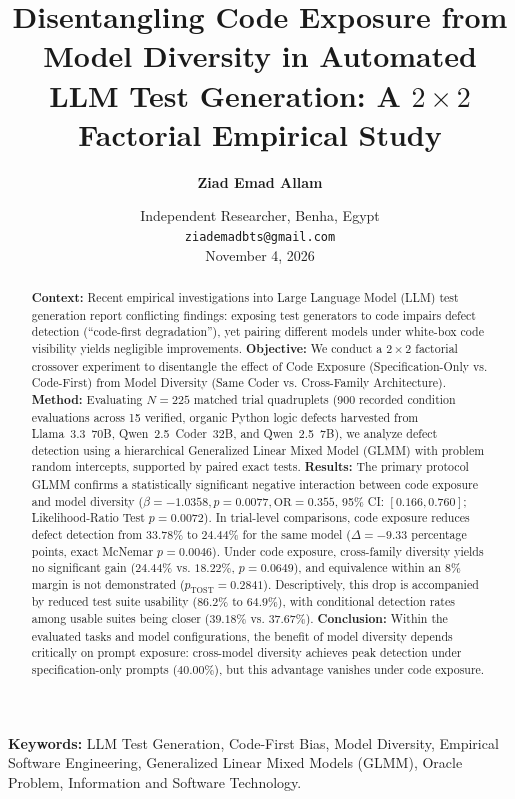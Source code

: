 \documentclass[11pt,a4paper]{article}
\title{\textbf{Disentangling Code Exposure from Model Diversity in Automated LLM Test Generation: A $2 \times 2$ Factorial Empirical Study}}
\author{\textbf{Ziad Emad Allam}}
\date{Independent Researcher, Benha, Egypt \\ \texttt{ziademadbts@gmail.com}\\[1em] November 4, 2026}
\begin{document}
\maketitle

\begin{abstract}
\noindent\textbf{Context:} Recent empirical investigations into Large Language Model (LLM) test generation report conflicting findings: exposing test generators to code impairs defect detection (``code-first degradation''), yet pairing different models under white-box code visibility yields negligible improvements.
\textbf{Objective:} We conduct a $2 \times 2$ factorial crossover experiment to disentangle the effect of Code Exposure (Specification-Only vs. Code-First) from Model Diversity (Same Coder vs. Cross-Family Architecture).
\textbf{Method:} Evaluating $N=225$ matched trial quadruplets (900 recorded condition evaluations across 15 verified, organic Python logic defects harvested from Llama~3.3~70B, Qwen~2.5~Coder~32B, and Qwen~2.5~7B), we analyze defect detection using a hierarchical Generalized Linear Mixed Model (GLMM) with problem random intercepts, supported by paired exact tests.
\textbf{Results:} The primary protocol GLMM confirms a statistically significant negative interaction between code exposure and model diversity ($\beta = -1.0358, p = 0.0077, \text{OR} = 0.355$, 95\% CI: $[0.166, 0.760]$; Likelihood-Ratio Test $p = 0.0072$). In trial-level comparisons, code exposure reduces defect detection from $33.78\%$ to $24.44\%$ for the same model ($\Delta = -9.33$ percentage points, exact McNemar $p = 0.0046$). Under code exposure, cross-family diversity yields no significant gain ($24.44\%$ vs. $18.22\%$, $p = 0.0649$), and equivalence within an $8\%$ margin is not demonstrated ($p_{\text{TOST}} = 0.2841$). Descriptively, this drop is accompanied by reduced test suite usability ($86.2\%$ to $64.9\%$), with conditional detection rates among usable suites being closer ($39.18\%$ vs. $37.67\%$).
\textbf{Conclusion:} Within the evaluated tasks and model configurations, the benefit of model diversity depends critically on prompt exposure: cross-model diversity achieves peak detection under specification-only prompts ($40.00\%$), but this advantage vanishes under code exposure.
\end{abstract}

\vspace{0.5em}
\noindent\textbf{Keywords:} LLM Test Generation, Code-First Bias, Model Diversity, Empirical Software Engineering, Generalized Linear Mixed Models (GLMM), Oracle Problem, Information and Software Technology.
\end{document}
